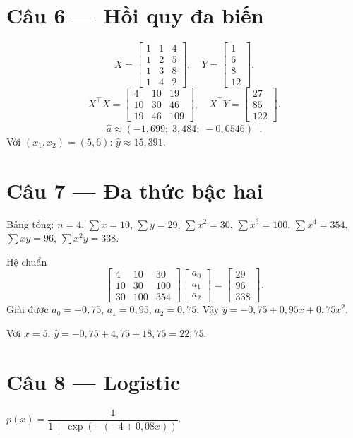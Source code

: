 \section*{Câu 6 --- Hồi quy đa biến}
\[
X=\begin{bmatrix}1&1&4\\1&2&5\\1&3&8\\1&4&2\end{bmatrix},\quad
Y=\begin{bmatrix}1\\6\\8\\12\end{bmatrix}.
\]
\[
X^\top X=\begin{bmatrix}4&10&19\\10&30&46\\19&46&109\end{bmatrix},\quad
X^\top Y=\begin{bmatrix}27\\85\\122\end{bmatrix}.
\]
\[
\hat a\approx(-1{,}699;\;3{,}484;\;-0{,}0546)^\top.
\]
Với $(x_1,x_2)=(5,6)$: $\hat y\approx 15{,}391$.

\section*{Câu 7 --- Đa thức bậc hai}
Bảng tổng: $n=4$, $\sum x=10$, $\sum y=29$, $\sum x^2=30$, $\sum x^3=100$, $\sum x^4=354$, $\sum xy=96$, $\sum x^2y=338$.

Hệ chuẩn
\[
\begin{bmatrix}4&10&30\\10&30&100\\30&100&354\end{bmatrix}
\begin{bmatrix}a_0\\a_1\\a_2\end{bmatrix}
=
\begin{bmatrix}29\\96\\338\end{bmatrix}.
\]
Giải được $a_0=-0{,}75$, $a_1=0{,}95$, $a_2=0{,}75$. Vậy $\hat y=-0{,}75+0{,}95x+0{,}75x^2$.

Với $x=5$: $\hat y=-0{,}75+4{,}75+18{,}75=22{,}75$.

\section*{Câu 8 --- Logistic}
$p(x)=\dfrac{1}{1+\exp(-(-4+0{,}08x))}$.

